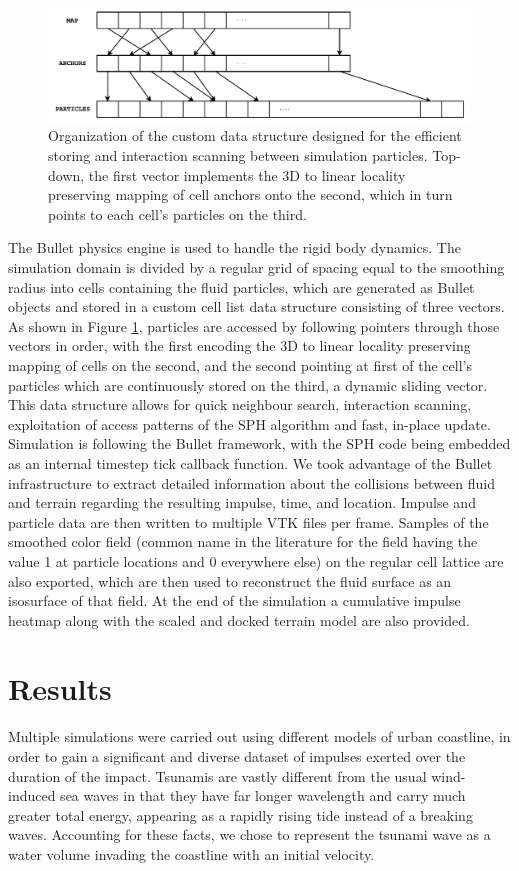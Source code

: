 \documentclass{llncs}
\begin{document}
\begin{figure}
  \includegraphics[width=\textwidth]{../report/figures/lp-grid.pdf}
  \caption{Organization of the custom data structure designed for the efficient storing
    and interaction scanning between simulation particles. Top-down, the first vector
    implements the 3D to linear locality preserving mapping of cell anchors onto the
    second, which in turn points to each cell's particles on the third.}
  \label{fig:lp-grid}
\end{figure}

The Bullet physics engine is used to handle the rigid body dynamics. The simulation domain
is divided by a regular grid of spacing equal to the smoothing radius into cells
containing the fluid particles, which are generated as Bullet objects and stored in a
custom cell list data structure consisting of three vectors. As shown in Figure
\ref{fig:lp-grid}, particles are accessed by following pointers through those vectors in
order, with the first encoding the 3D to linear locality preserving mapping of cells on
the second, and the second pointing at first of the cell's particles which are
continuously stored on the third, a dynamic sliding vector. This data structure allows for
quick neighbour search, interaction scanning, exploitation of access patterns of the SPH
algorithm and fast, in-place update. Simulation is following the Bullet framework, with
the SPH code being embedded as an internal timestep tick callback function. We took
advantage of the Bullet infrastructure to extract detailed information about the
collisions between fluid and terrain regarding the resulting impulse, time, and
location. Impulse and particle data are then written to multiple VTK files per
frame. Samples of the smoothed color field (common name in the literature for the field
having the value 1 at particle locations and 0 everywhere else) on the regular cell
lattice are also exported, which are then used to reconstruct the fluid surface as an
isosurface of that field. At the end of the simulation a cumulative impulse heatmap along
with the scaled and docked terrain model are also provided.

\section{Results}
Multiple simulations were carried out using different models of urban coastline, in order
to gain a significant and diverse dataset of impulses exerted over the duration of the
impact. Tsunamis are vastly different from the usual wind-induced sea waves in that they
have far longer wavelength and carry much greater total energy, appearing as a rapidly
rising tide instead of a breaking waves. Accounting for these facts, we chose to represent
the tsunami wave as a water volume invading the coastline with an initial velocity.
\end{document}
